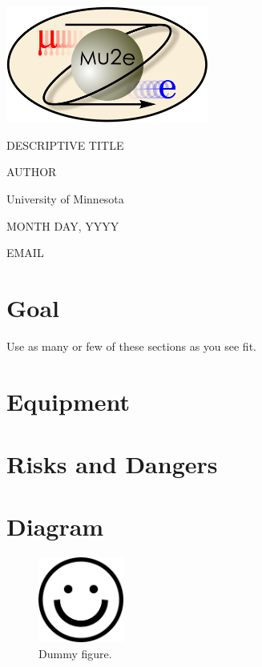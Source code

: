 \documentclass[letterpaper,12pt]{article}
\begin{document}
\begin{titlepage}
	\centering
	\includegraphics[width=0.5\textwidth]{mu2e_logo_oval.png}\par\vspace{2cm}
	{\scshape\LARGE DESCRIPTIVE TITLE\par}
	\vspace{3cm}
	{\Large AUTHOR\par}
	\vspace{3cm}
	{\large University of Minnesota\par}
 	\vspace{.5cm}
	{\large MONTH DAY, YYYY\par}
	\vfill
	{EMAIL\par}
\end{titlepage}

\clearpage
\setcounter{page}{2}


\section{Goal}
Use as many or few of these sections as you see fit.

\section{Equipment}


\section{Risks and Dangers}


\section{Diagram}
	\begin{figure} [h]
		\centering
		\includegraphics[width=0.25\textwidth]{dummy.png}
		\caption{Dummy figure.}
		\label{fig:dummy}
	\end{figure}
\end{document}
